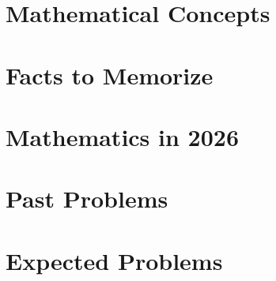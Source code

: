 \documentclass[11pt,oneside]{book}
\theoremstyle{sciencequizdefinition}
\theoremstyle{sciencequizplain}
\theoremstyle{sciencequizdefinition}
\theoremstyle{sciencequizsameline}
\begin{document}
    \part{Mathematical Concepts}

    

    \part{Facts to Memorize}

    

    \part{Mathematics in 2026}

    

    \part{Past Problems}

    

    \part{Expected Problems}

    
\end{document}
